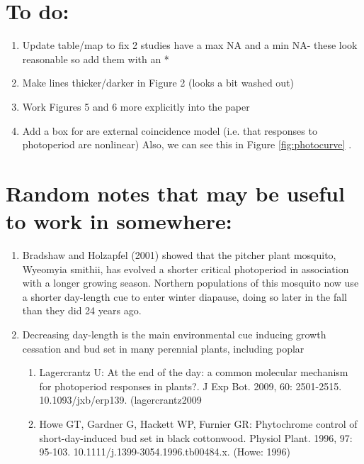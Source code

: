 \documentclass{article}
\begin{document}
\section* {To do:}
\begin{enumerate}
\item Update table/map to fix 2 studies have a max NA and a min NA- these look reasonable so add them with an *
\item Make lines thicker/darker in Figure 2 (looks a bit washed out)
\item Work Figures 5 and 6 more explicitly into the paper
\item Add a box for are external coincidence model (i.e. that responses to photoperiod are nonlinear) Also, we can see this in Figure \ref {fig:photocurve} .
\end{enumerate}
\section* {Random notes that may be useful to work in somewhere:}
\begin {enumerate}
\item Bradshaw and Holzapfel (2001) showed that the pitcher plant mosquito,
Wyeomyia smithii, has evolved a shorter critical photoperiod in association with a
longer growing season. Northern populations of this mosquito now use a shorter
day-length cue to enter winter diapause, doing so later in the fall than they did
24 years ago.
\item Decreasing day-length is the main environmental cue inducing growth cessation and bud set in many perennial plants, including poplar 
\begin{enumerate}

\item Lagercrantz U: At the end of the day: a common molecular mechanism for photoperiod responses in plants?. J Exp Bot. 2009, 60: 2501-2515. 10.1093/jxb/erp139. (lagercrantz2009
\item Howe GT, Gardner G, Hackett WP, Furnier GR: Phytochrome control of short-day-induced bud set in black cottonwood. Physiol Plant. 1996, 97: 95-103. 10.1111/j.1399-3054.1996.tb00484.x. (Howe: 1996)
\end{enumerate}


\end {enumerate}

\clearpage
\end{document}

